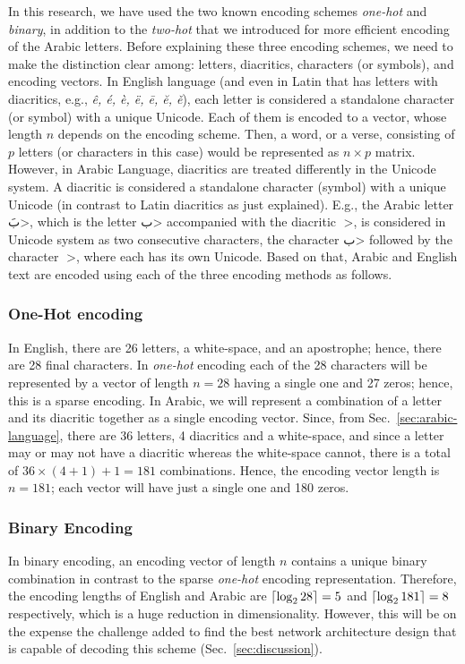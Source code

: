 \documentclass[journal,10pt,twocolumns,letter]{IEEEtran}
\DeclarePairedDelimiter{\ceil}{\lceil}{\rceil}
\begin{document}
In this research, we have used the two known encoding schemes \textit{one-hot} and \textit{binary},
in addition to the \textit{two-hot} that we introduced for more efficient encoding of the Arabic
letters. Before explaining these three encoding schemes, we need to make the distinction clear
among: letters, diacritics, characters (or symbols), and encoding vectors. In English language (and
even in Latin that has letters with diacritics, e.g., \textit{ê, é, è, ë, ē, ĕ, ě}), each letter is
considered a standalone character (or symbol) with a unique Unicode. Each of them is encoded to a
vector, whose length $n$ depends on the encoding scheme. Then, a word, or a verse, consisting of $p$
letters (or characters in this case) would be represented as $n \times p$ matrix. However, in Arabic
Language, diacritics are treated differently in the Unicode system. A diacritic is considered a
standalone character (symbol) with a unique Unicode (in contrast to Latin diacritics as just
explained). E.g., the Arabic letter \<بَ>, which is the letter \<ب> accompanied
with the diacritic \<◌َ>, is considered in Unicode system as two consecutive characters,
the character \<ب> followed by the character \<◌َ>, where each has its own
Unicode. Based on that, Arabic and English text are encoded using each of the three encoding methods
as follows.

\bigskip

\subsubsection{One-Hot encoding}\label{sec:one-hot-encoding}
In English, there are 26 letters, a white-space, and an apostrophe; hence, there are 28 final
characters. In \textit{one-hot} encoding each of the 28 characters will be represented by a vector
of length $n=28$ having a single one and 27 zeros; hence, this is a sparse encoding. In Arabic, we
will represent a combination of a letter and its diacritic together as a single encoding
vector. Since, from Sec.~\ref{sec:arabic-language}, there are 36 letters, 4 diacritics and a
white-space, and since a letter may or may not have a diacritic whereas the white-space cannot,
there is a total of $36 \times (4+1) + 1 = 181$ combinations. Hence, the encoding vector length is
$n=181$; each vector will have just a single one and 180 zeros.


\subsubsection{Binary Encoding}\label{sec:binary-encoding}
In binary encoding, an encoding vector of length $n$ contains a unique binary combination in
contrast to the sparse \textit{one-hot} encoding representation. Therefore, the encoding lengths of
English and Arabic are $\ceil{\log_2 28} = 5$ and $\ceil{\log_2 181} = 8$ respectively, which is a
huge reduction in dimensionality. However, this will be on the expense the challenge added to find
the best network architecture design that is capable of decoding this scheme
(Sec.~\ref{sec:discussion}).
\end{document}
